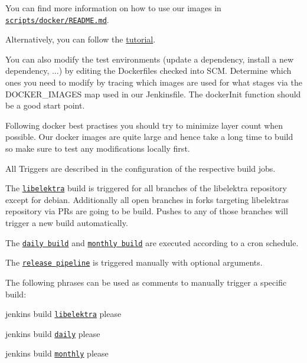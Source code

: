 You can find more information on how to use our images in \href{https://master.libelektra.org/scripts/docker/README.md#testing-elektra-via-docker-images}{\tt scripts/docker/\+R\+E\+A\+D\+M\+E.\+md}.

Alternatively, you can follow the \hyperlink{doc_tutorials_run_all_tests_with_docker_md}{tutorial}.

You can also modify the test environments (update a dependency, install a new dependency, ...) by editing the Dockerfiles checked into S\+CM. Determine which ones you need to modify by tracing which images are used for what stages via the {\ttfamily D\+O\+C\+K\+E\+R\+\_\+\+I\+M\+A\+G\+ES} map used in our Jenkinsfile. The {\ttfamily docker\+Init} function should be a good start point.

Following docker best practises you should try to minimize layer count when possible. Our docker images are quite large and hence take a long time to build so make sure to test any modifications locally first.

All Triggers are described in the configuration of the respective build jobs.

The \href{https://build.libelektra.org/job/libelektra/}{\tt libelektra} build is triggered for all branches of the libelektra repository except for {\ttfamily debian}. Additionally all open branches in forks targeting libelektra\textquotesingle{}s repository via P\+Rs are going to be build. Pushes to any of those branches will trigger a new build automatically.

The \href{https://build.libelektra.org/job/libelektra-daily/}{\tt daily build} and \href{https://build.libelektra.org/job/libelektra-monthly/}{\tt monthly build} are executed according to a cron schedule.

The \href{https://build.libelektra.org/job/libelektra-release/}{\tt release pipeline} is triggered manually with optional arguments.

The following phrases can be used as comments to manually trigger a specific build\+:


\begin{DoxyItemize}
\item jenkins build \href{https://build.libelektra.org/job/libelektra/}{\tt libelektra} please
\item jenkins build \href{https://build.libelektra.org/job/libelektra-daily/}{\tt daily} please
\item jenkins build \href{https://build.libelektra.org/job/libelektra-monthly/}{\tt monthly} please
\end{DoxyItemize}

